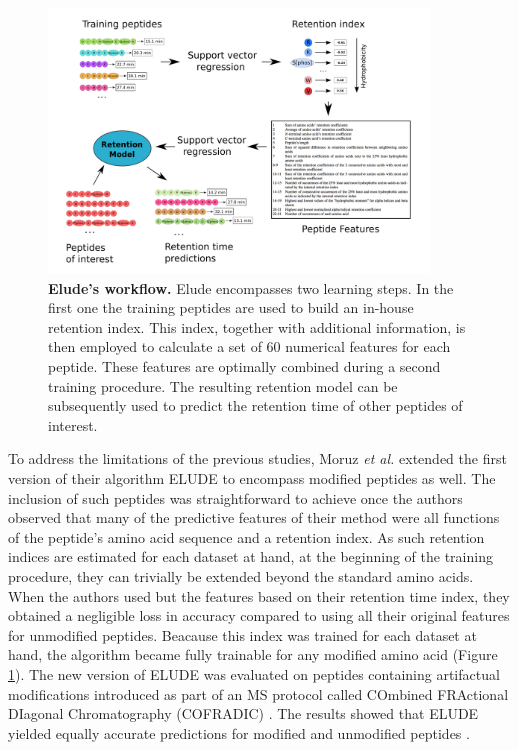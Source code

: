 \documentclass[a4paper]{article}
\begin{document}
\begin{figure}[p]
\centering 
\includegraphics[width=0.9\textwidth]{img/elude-ptm.pdf}
\caption{\label{fig:elude} {\bf {\sc Elude}'s workflow.}  {\sc Elude} encompasses two learning steps. In the first one the training peptides are used to build an in-house retention index. This index, together with additional information, is then employed to calculate a set of 60 numerical features for each peptide. These features are optimally combined during a second training procedure. The resulting retention model can be subsequently used to predict the retention time of other peptides of interest.}
\end{figure}

To address the limitations of the previous studies, Moruz {\em et al.}
\cite{elude2} extended the first version of their algorithm {\sc
  ELUDE} to encompass modified peptides as well. The inclusion of such
peptides was straightforward to achieve once the authors observed that
many of the predictive features of their method were all functions of
the peptide's amino acid sequence and a retention index. As such
retention indices are estimated for each dataset at hand, at the
beginning of the training procedure, they can trivially be extended
beyond the standard amino acids. When the authors used but the
features based on their retention time index, they obtained a
negligible loss in accuracy compared to using all their original
features for unmodified peptides. Beacause this index was trained for
each dataset at hand, the algorithm became fully trainable for any
modified amino acid (Figure \ref{fig:elude}). The new version of {\sc
  ELUDE} was evaluated on peptides containing artifactual
modifications introduced as part of an MS protocol called COmbined
FRActional DIagonal Chromatography (COFRADIC) \cite{Gevaert2002}. The
results showed that {\sc ELUDE} yielded equally accurate predictions
for modified and unmodified peptides \cite{elude2}.
\end{document}
